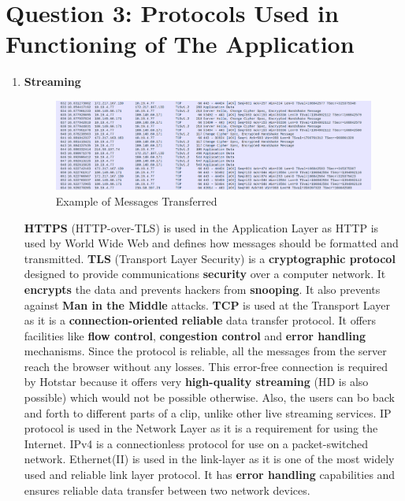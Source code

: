 \documentclass[a4paper,10pt]{article}
\newlength{\strutheight}
\begin{document}
\section*{Question 3: Protocols Used in Functioning of The Application}
\begin{enumerate}
	\item \textbf{\color{Magenta} \large Streaming}\\
	\begin{adjustbox}{valign=T,raise=\strutheight,minipage={\linewidth}}
		\begin{figure}
			\includegraphics[width=14cm]{Images/stream}
			\caption{Example of Messages Transferred}
		\end{figure}
		\strut{}
		\textbf{HTTPS} (HTTP-over-TLS) is used in the Application Layer as HTTP is used by World Wide Web and defines how messages should be formatted and transmitted. \textbf{TLS} (Transport Layer Security) is a \textbf{cryptographic protocol} designed to provide communications \textbf{security} over a computer network. It \textbf{encrypts} the data and prevents hackers from \textbf{snooping}. It also prevents against \textbf{Man in the Middle} attacks. \textbf{TCP} is used at the Transport Layer as it is a \textbf{connection-oriented} \textbf{reliable} data transfer protocol. It offers facilities like \textbf{flow control}, \textbf{congestion control} and \textbf{error handling} mechanisms. Since the protocol is reliable, all the messages from the server reach the browser without any losses. This error-free connection is required by Hotstar because it offers very \textbf{high-quality streaming} (HD is also possible) which would not be possible otherwise. Also, the users can bo back and forth to different parts of a clip, unlike other live streaming services. IP protocol is used in the Network Layer as it is a requirement for using the Internet. IPv4 is a connectionless protocol for use on a packet-switched network. Ethernet(II) is used in the link-layer as it is one of the most widely used and reliable link layer protocol. It has \textbf{error handling} capabilities and ensures reliable data transfer between two network devices.

\end{adjustbox}
\end{enumerate}
\end{document}
